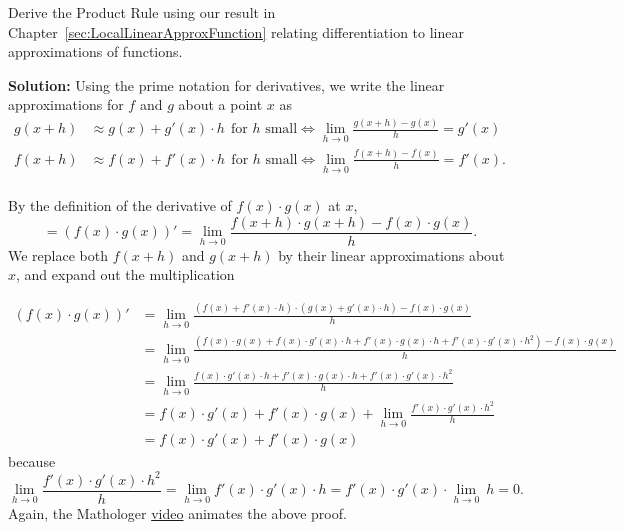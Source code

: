 \vspace*{.2cm}
\begin{example} 
\label{ex:deriveProductRule}
Derive the Product Rule using our result in Chapter~\ref{sec:LocalLinearApproxFunction} relating differentiation to linear approximations of functions.
    
\end{example}
\textbf{Solution:} Using the prime notation for derivatives, we write the linear approximations for $f$ and $g$ about a point $x$ as
\begin{align*}
    g(x+h) &\approx g(x) + g'(x)\cdot h ~~\text{for $h$ small} \iff \lim_{h \to 0} \frac{g(x+h) - g(x)}{h} = g'(x) \\[1em]
    f(x+ h) &\approx f(x) + f'(x)\cdot h ~~\text{for $h$ small} \iff \lim_{h \to 0} \frac{f(x + h) - f(x)}{h} = f'(x). \\
\end{align*}


By the definition of the derivative of $f(x) \cdot g(x)$ at $x$,
$$ = \left(f(x) \cdot g(x) \right)' = \lim_{h \to 0} \frac{f(x+h) \cdot g(x+h)- f(x) \cdot g(x)}{h} .$$
We replace both $f(x+h)$ and  $g(x+h)$ by their linear approximations about $x$, and expand out the multiplication

\begin{align*}
    \left(f(x) \cdot g(x)  \right)' &= \lim_{h \to 0} \frac{\left( f(x) + f'(x) \cdot h  \right) \cdot \left(g(x) + g'(x) \cdot h \right) - f(x) \cdot g(x) }{h} \\[1em]
                                    &= \lim_{h \to 0} \frac{\left( f(x) \cdot g(x) + f(x) \cdot g'(x) \cdot h + f'(x) \cdot g(x) \cdot h +  f'(x) \cdot g'(x) \cdot h^2 \right) - f(x) \cdot g(x) }{h} \\[1em]
                                    & =  \lim_{h \to 0} \frac{ f(x) \cdot g'(x) \cdot h + f'(x) \cdot g(x) \cdot h +  f'(x) \cdot g'(x) \cdot h^2 }{h} \\[1em]
                                    & =  f(x) \cdot g'(x)  + f'(x) \cdot g(x)  + \lim_{h \to 0} \frac{   f'(x) \cdot g'(x) \cdot h^2 }{h} \\[1em]
                                    & =  f(x) \cdot g'(x)  + f'(x) \cdot g(x)
\end{align*}
because
$$ \lim_{h \to 0} \frac{   f'(x) \cdot g'(x) \cdot h^2 }{h} =   \lim_{h \to 0} f'(x) \cdot g'(x) \cdot h=  f'(x) \cdot g'(x)  \cdot\lim_{h \to 0}~ h  =0.$$
Again, the Mathologer \href{https://youtu.be/kuOxDh3egN0?t=1669}{video} animates the above proof.



